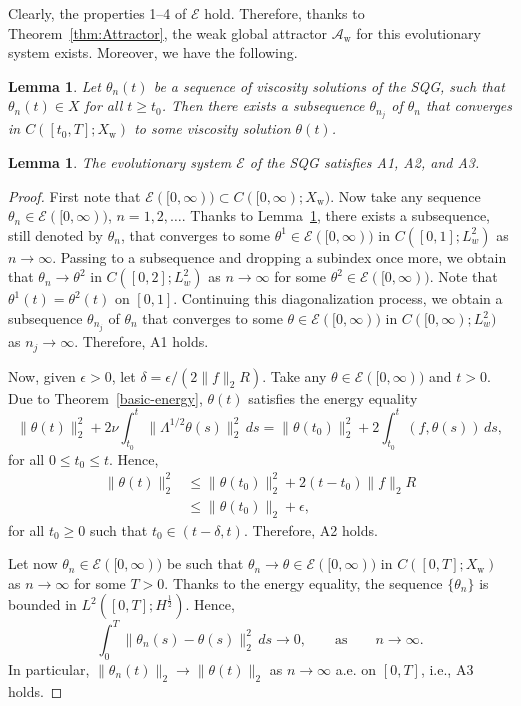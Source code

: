 \documentclass{amsart}
\newcommand{\La}{\Lambda}
\newcommand{\Aw}{\mathcal{A}_{\mathrm{w}}}
\newcommand{\Ec}{\mathcal{E}}
\newcommand{\Xw}{X_{\mathrm{w}}}
\newcommand{\ddt}{\frac{d}{dt}}
\numberwithin{Theorem}{section}
\newtheorem {Lemma}[Theorem]  {Lemma}
\theoremstyle{definition}
\theoremstyle{remark}
\renewcommand{\th}{\theta}
\begin{document}
Clearly, the properties 1--4 of $\Ec$ hold.
Therefore, thanks to Theorem~\ref{thm:Attractor}, the weak global attractor $\Aw$
for this evolutionary system exists. Moreover, we have the following.
\begin{Lemma} \label{l:convergenceofLH}
Let $\th_n(t)$ be a sequence of viscosity solutions of the SQG,
such that $\th_n(t) \in X$ for all $t\geq t_0$. Then 
there exists a subsequence $\th_{n_j}$ of $\th_n$ that converges
in $C([t_0, T]; \Xw)$ to some viscosity solution $\th(t)$. %
\end{Lemma}
\begin{Lemma} \label{l:compact}
The evolutionary system $\Ec$ of the SQG
satisfies A1, A2, and A3.
\end{Lemma}
\begin{proof}
First note that $\Ec([0,\infty)) \subset C([0,\infty);\Xw)$. Now take any sequence
$\th_n \in \Ec([0,\infty))$, $n=1,2, \dots$.
Thanks to Lemma~\ref{l:convergenceofLH}, there exists
a subsequence, still denoted by  $\th_n$, that converges
to some $\th^{1} \in \Ec([0,\infty))$ in $C([0, 1];L^2_w)$ as $n \to \infty$.
Passing to a subsequence and dropping a subindex once more, we obtain that
$\th_n \to \theta^2$ in $C([0, 2];L^2_w)$ as $n \to \infty$ for some 
$\th^{2} \in \Ec([0,\infty))$.
Note that $\th^1(t)=\th^2(t)$ on $[0, 1]$.
Continuing
this diagonalization process, we obtain a subsequence $\th_{n_j}$
of $\th_n$ that converges
to some $\th \in \Ec([0,\infty))$ in $C([0, \infty);L^2_w)$ as $n_j \to \infty$.
Therefore, A1 holds.

Now, given $\epsilon>0$, let $\delta=\epsilon/(2 \|f\|_2R)$. Take any $\th \in \Ec([0,\infty))$
and $t>0$. Due to Theorem~\ref{basic-energy}, $\th(t)$ satisfies the energy equality
\[
\|\th(t)\|_2^2 + 2\nu \int_{t_0}^t \|\La^{1/2}\th(s)\|_2^2 \, ds =
\|\th(t_0)\|_2^2 + 2\int_{t_0}^t (f, \th(s)) \, ds,
\]
for all $0 \leq t_0 \leq t$. Hence,
\[
\begin{split}
\|\th(t)\|_2^2 &\leq \|\th(t_0)\|_2^2 + 2(t-t_0) \|f\|_2 R\\
&\leq \|\th(t_0)\|_2 + \epsilon,
\end{split}
\]
for all $t_0\geq 0$ such that $t_0 \in (t-\delta,t)$. Therefore, A2 holds.

Let now $\th_n \in \Ec([0,\infty))$ be such that $\th_n \to \th\in\Ec([0,\infty))$ in
$C([0, T];\Xw)$ as $n\to \infty$ for some
$T>0$. Thanks to the energy equality, the sequence $\{\th_n\}$
is bounded in $L^2([0,T];H^{\frac12})$. Hence,
\[
\int_{0}^T \|\th_n(s)-\th(s)\|_2^2 \, ds \to 0, \qquad \mbox{as}
\qquad  n \to \infty.
\]
In particular, $\|\th_n(t)\|_2 \to \|\th(t)\|_2$ as $n \to \infty$ a.e. on $[0,T]$,
i.e., A3 holds.
\end{proof}
\end{document}
